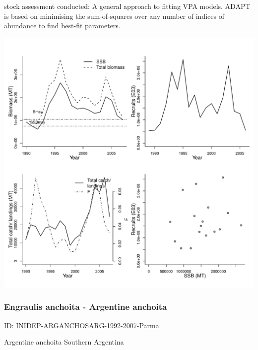 stock assessment conducted: A general approach to fitting VPA models. ADAPT is based on minimising the sum-of-squares over any number of indices of abundance to find best-fit parameters. 
\begin{center}
\vspace{-0.2cm}\includegraphics[scale=0.65]{../tex/figures/plot-INIDEP-ARGANCHONARG-1989-2007-Parma.pdf}
\end{center}

\newpage
\subsubsection{Engraulis anchoita - Argentine anchoita}
ID: INIDEP-ARGANCHOSARG-1992-2007-Parma

Argentine anchoita Southern Argentina 

